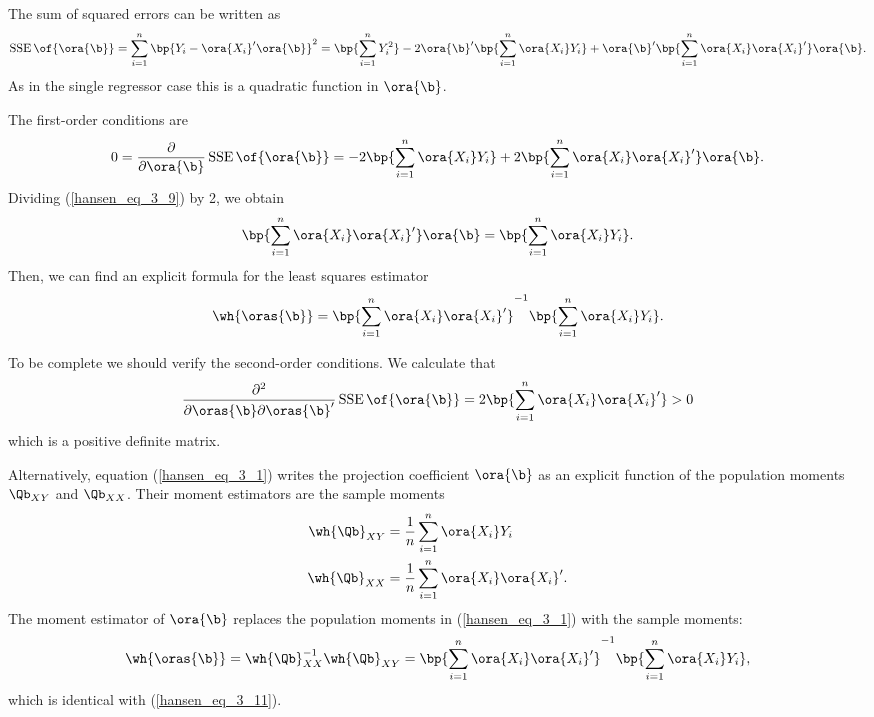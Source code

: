 The sum of squared errors can be written as
\begin{equation}
    \notag
    \operatorname*{SSE}\of{\ora{\b}} = \sum_{i=1}^n \bp{Y_i - \ora{X_i}^\prime \ora{\b}}^2 = \bp{\sum_{i=1}^n Y_i^2} - 2\ora{\b}^\prime \bp{\sum_{i=1}^n \ora{X_i} Y_i} + \ora{\b}^\prime \bp{\sum_{i=1}^n \ora{X_i} \ora{X_i}^\prime}\ora{\b}.
\end{equation}
As in the single regressor case this is a quadratic function in $\ora{\b}$.

The first-order conditions are 
\begin{equation}
    \label{hansen_eq_3_9}
    0 = \frac{\partial}{\partial \ora{\b}} \operatorname*{SSE}\of{\ora{\b}} = -2 \bp{\sum_{i=1}^n \ora{X_i} Y_i} + 2 \bp{\sum_{i=1}^n \ora{X_i} \ora{X_i}^\prime}\ora{\b}.
\end{equation}
Dividing (\ref{hansen_eq_3_9}) by 2, we obtain
\begin{equation}
    \label{hansen_eq_3_10}
    \bp{\sum_{i=1}^n \ora{X_i} \ora{X_i}^\prime}\ora{\b} = \bp{\sum_{i=1}^n \ora{X_i} Y_i} .
\end{equation}
Then, we can find an explicit formula for the least squares estimator
\begin{equation}
    \label{hansen_eq_3_11}
    \wh{\oras{\b}} = \bp{\sum_{i=1}^n \ora{X_i} \ora{X_i}^\prime}^{-1} \bp{\sum_{i=1}^n \ora{X_i} Y_i}.
\end{equation}

To be complete we should verify the second-order conditions. We calculate that
\begin{equation}
    \notag
    \frac{\partial ^2}{\partial \oras{\b} \partial \oras{\b}^\prime} \operatorname*{SSE}\of{\ora{\b}} = 2 \bp{\sum_{i=1}^n \ora{X_i} \ora{X_i}^\prime} > 0
\end{equation}
which is a positive definite matrix.

Alternatively, equation (\ref{hansen_eq_3_1}) writes the projection coefficient $\ora{\b}$ as an explicit function of the population moments $\Qb_{XY}$ and $\Qb_{XX}$. Their moment estimators are the sample moments
\begin{equation}
    \notag
    \begin{aligned}
        \wh{\Qb}_{XY} & = \frac{1}{n} \sum_{i=1}^n \ora{X_i} Y_i \\ 
        \wh{\Qb}_{XX} & = \frac{1}{n} \sum_{i=1}^n \ora{X_i} \ora{X_i}^\prime .
    \end{aligned}
\end{equation}
The moment estimator of $\ora{\b}$ replaces the population moments in (\ref{hansen_eq_3_1}) with the sample moments:
\begin{equation}
    \wh{\oras{\b}} = \wh{\Qb}_{XX}^{-1}\wh{\Qb}_{XY} = \bp{\sum_{i=1}^n \ora{X_i} \ora{X_i}^\prime}^{-1} \bp{\sum_{i=1}^n \ora{X_i} Y_i},
\end{equation}
which is identical with (\ref{hansen_eq_3_11}).

